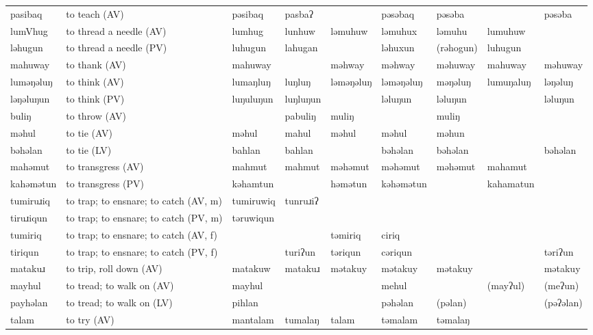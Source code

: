 \begin{landscape}
\begin{longtable}{*{9}{>{\raggedright\arraybackslash}p{}}}
\text{*}pasibaq      & to teach (AV) & pəsibaq & pasbaʔ &  & pəsəbaq & pəsəba &  & pəsəba\\
\text{*}lumVhug      & to thread a needle (AV) & lumhug & lunhuw & ləmuhuw & ləmuhux & ləmuhu & lumuhuw & \\
\text{*}ləhugun      & to thread a needle (PV) & luhugun & lahugan &  & ləhuxun & (rəhogun) & luhugun & \\
\text{*}mahuway      & to thank (AV) & mahuway &  & məhway & məhway & məhuway & mahuway & məhuway\\
\text{*}luməŋəluŋ    & to think (AV) & lumaŋluŋ & luŋluŋ & ləməŋəluŋ & ləməŋəluŋ & məŋəluŋ & lumuŋaluŋ & ləŋəluŋ\\
\text{*}ləŋəluŋun    & to think (PV) & luŋuluŋun & luŋluŋun &  & ləluŋun & ləluŋun &  & ləluŋun\\
\text{*}buliŋ       & to throw (AV) &  & pabuliŋ & muliŋ &  & muliŋ &  & \\
\text{*}məhul        & to tie (AV) & məhul & mahul & məhul & məhul & məhun &  & \\
\text{*}bəhəlan      & to tie (LV) & bahlan & bahlan &  & bəhəlan & bəhəlan &  & bəhəlan\\
\text{*}mahəmut      & to transgress (AV) & mahmut & mahmut & məhəmut & məhəmut & məhəmut & mahamut & \\
\text{*}kahəmətun    & to transgress (PV) & kəhamtun &  & həmətun & kəhəmətun &  & kahamatun & \\
\text{*}tumiruɹiq    & to trap; to ensnare; to catch (AV, m) & tumiruwiq & tunruɹiʔ &  &  &  &  & \\
\text{*}tiruɹiqun    & to trap; to ensnare; to catch (PV, m) & təruwiqun &  &  &  &  &  & \\
\text{*}tumiriq      & to trap; to ensnare; to catch (AV, f) &  &  & təmiriq & ciriq &  &  & \\
\text{*}tiriqun      & to trap; to ensnare; to catch (PV, f) &  & turiʔun & təriqun & cəriqun &  &  & təriʔun\\
\text{*}matakuɹ      & to trip, roll down (AV) & matakuw & matakuɹ & mətakuy & mətakuy & mətakuy &  & mətakuy\\
\text{*}mayhul       & to tread; to walk on (AV) & mayhul &  &  & mehul &  & (mayʔul) & (meʔun)\\
\text{*}payhəlan     & to tread; to walk on (LV) & pihlan &  &  & pəhəlan & (pəlan) &  & (pəʔəlan)\\
\text{*}talam       & to try (AV) & mantalam & tumalaŋ & talam & təmalam & təmalaŋ &  & \\

\end{longtable}
\end{landscape}
